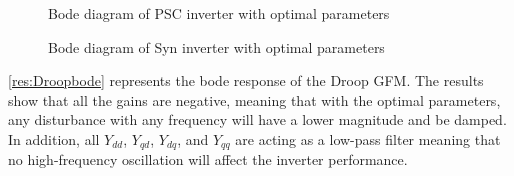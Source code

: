 \begin{figure}[ht]
    \centering
     \nonindent
	\caption[Bode diagram of \gls{PSC} inverter]{Bode diagram of \gls{PSC} inverter with optimal parameters}
	\label{res:PSCbode}
\end{figure}


\begin{figure}[ht]
    \centering
     \nonindent
	\caption[Bode diagram of \gls{Syn} inverter]{Bode diagram of \gls{Syn} inverter with optimal parameters}
	\label{res:Synbode}
\end{figure}

\ref{res:Droopbode} represents the bode response of the Droop \gls{GFM}. The results show that all the gains are negative, meaning that with the optimal parameters, any disturbance with any frequency will have a lower magnitude and be damped. In addition, all $Y_{dd}$, $Y_{qd}$, $Y_{dq}$, and $Y_{qq}$ are acting as a low-pass filter meaning that no high-frequency oscillation will affect the inverter performance.


